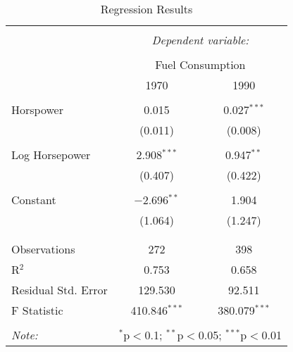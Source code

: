 
\begin{table}[!htbp] \centering 
  \caption{Regression Results} 
  \label{} 
\begin{tabular}{@{\extracolsep{5pt}}lcc} 
\\[-1.8ex]\hline 
\hline \\[-1.8ex] 
 & \multicolumn{2}{c}{\textit{Dependent variable:}} \\ 
\cline{2-3} 
\\[-1.8ex] & \multicolumn{2}{c}{Fuel Consumption} \\ 
 & 1970 & 1990 \\ 
\hline \\[-1.8ex] 
 Horspower & 0.015 & 0.027$^{***}$ \\ 
  & (0.011) & (0.008) \\ 
  & & \\ 
 Log Horsepower & 2.908$^{***}$ & 0.947$^{**}$ \\ 
  & (0.407) & (0.422) \\ 
  & & \\ 
 Constant & $-$2.696$^{**}$ & 1.904 \\ 
  & (1.064) & (1.247) \\ 
  & & \\ 
\hline \\[-1.8ex] 
Observations & 272 & 398 \\ 
R$^{2}$ & 0.753 & 0.658 \\ 
Residual Std. Error & 129.530 & 92.511 \\ 
F Statistic & 410.846$^{***}$ & 380.079$^{***}$ \\ 
\hline 
\hline \\[-1.8ex] 
\textit{Note:}  & \multicolumn{2}{r}{$^{*}$p$<$0.1; $^{**}$p$<$0.05; $^{***}$p$<$0.01} \\ 
\end{tabular} 
\end{table} 
